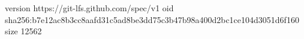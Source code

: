 version https://git-lfs.github.com/spec/v1
oid sha256:b7e12ac8b3cc8aafd31c5ad8be3dd75c3b47b98a400d2bc1ce104d3051d6f160
size 12562

